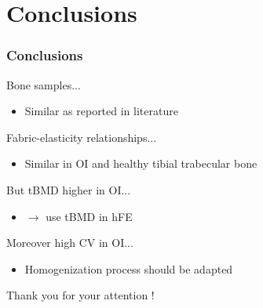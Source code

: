 \documentclass[xcolor=table,11pt]{beamer}
\begin{document}

\section{Conclusions}
\begin{frame}
	\frametitle{Conclusions}
	
	Bone samples...
	\begin{itemize}
		\item Similar as reported in literature
	\end{itemize}
	
	\vfill
	
	Fabric-elasticity relationships...
	\begin{itemize}
		\item Similar in OI and healthy tibial trabecular bone
	\end{itemize}
	
	\vfill
	
	But tBMD higher in OI...
	\begin{itemize}
		\item \cite{p12} $\rightarrow$ use tBMD in hFE
	\end{itemize}
	
	\vfill
	
	Moreover high CV in OI...
	\begin{itemize}
		\item Homogenization process should be adapted
	\end{itemize}
	
\end{frame}


\begin{frame}
	Thank you for your attention !	
\end{frame}

\appendix
\end{document}

